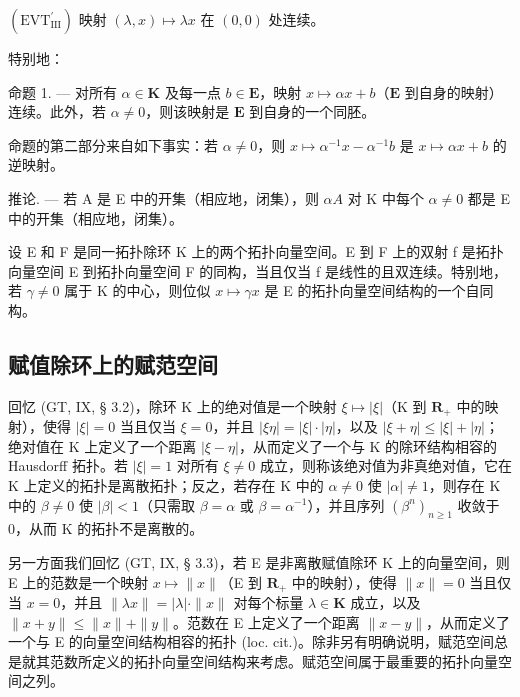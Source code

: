 \((\mathrm{EVT}_{\mathrm{III}}^{\prime})\) 映射 \((\lambda, x) \mapsto \lambda x\) 在 \((0, 0)\) 处连续。

特别地：

命题 1. --- 对所有 \(\alpha \in \mathbf{K}\) 及每一点 \(b \in \mathbf{E}\)，映射 \(x \mapsto \alpha x + b\)（\(\mathbf{E}\) 到自身的映射）连续。此外，若 \(\alpha \neq 0\)，则该映射是 \(\mathbf{E}\) 到自身的一个同胚。

命题的第二部分来自如下事实：若 \(\alpha \neq 0\)，则 \(x \mapsto \alpha^{-1}x - \alpha^{-1}b\) 是 \(x \mapsto \alpha x + b\) 的逆映射。

推论. --- 若 A 是 E 中的开集（相应地，闭集），则 \(\alpha A\) 对 K 中每个 \(\alpha \neq 0\) 都是 E 中的开集（相应地，闭集）。

设 E 和 F 是同一拓扑除环 K 上的两个拓扑向量空间。E 到 F 上的双射 f 是拓扑向量空间 E 到拓扑向量空间 F 的同构，当且仅当 f 是线性的且双连续。特别地，若 \(\gamma \neq 0\) 属于 K 的中心，则位似 \(x \mapsto \gamma x\) 是 E 的拓扑向量空间结构的一个自同构。

\subsection{赋值除环上的赋范空间}

回忆 (GT, IX, § 3.2)，除环 K 上的绝对值是一个映射 \(\xi \mapsto |\xi|\)（K 到 \(\mathbf{R}_{+}\) 中的映射），使得 \(|\xi| = 0\) 当且仅当 \(\xi = 0\)，并且 \(|\xi \eta| = |\xi| \cdot |\eta|\)，以及 \(|\xi + \eta| \leqslant |\xi| + |\eta|\)；绝对值在 K 上定义了一个距离 \(|\xi - \eta|\)，从而定义了一个与 K 的除环结构相容的 Hausdorff 拓扑。若 \(|\xi| = 1\) 对所有 \(\xi \neq 0\) 成立，则称该绝对值为非真绝对值，它在 K 上定义的拓扑是离散拓扑；反之，若存在 K 中的 \(\alpha \neq 0\) 使 \(|\alpha| \neq 1\)，则存在 K 中的 \(\beta \neq 0\) 使 \(|\beta| < 1\)（只需取 \(\beta = \alpha\) 或 \(\beta = \alpha^{-1}\)），并且序列 \((\beta^n)_{n \geqslant 1}\) 收敛于 0，从而 K 的拓扑不是离散的。

另一方面我们回忆 (GT, IX, § 3.3)，若 E 是非离散赋值除环 K 上的向量空间，则 E 上的范数是一个映射 \(x \mapsto \|x\|\)（E 到 \(\mathbf{R}_{+}\) 中的映射），使得 \(\|x\| = 0\) 当且仅当 \(x = 0\)，并且 \(\| \lambda x \| = |\lambda| \cdot \| x\|\) 对每个标量 \(\lambda \in \mathbf{K}\) 成立，以及 \(\|x + y\| \leqslant \|x\| + \|y\|\)。范数在 E 上定义了一个距离 \(\|x - y\|\)，从而定义了一个与 E 的向量空间结构相容的拓扑 (loc. cit.)。除非另有明确说明，赋范空间总是就其范数所定义的拓扑向量空间结构来考虑。赋范空间属于最重要的拓扑向量空间之列。

